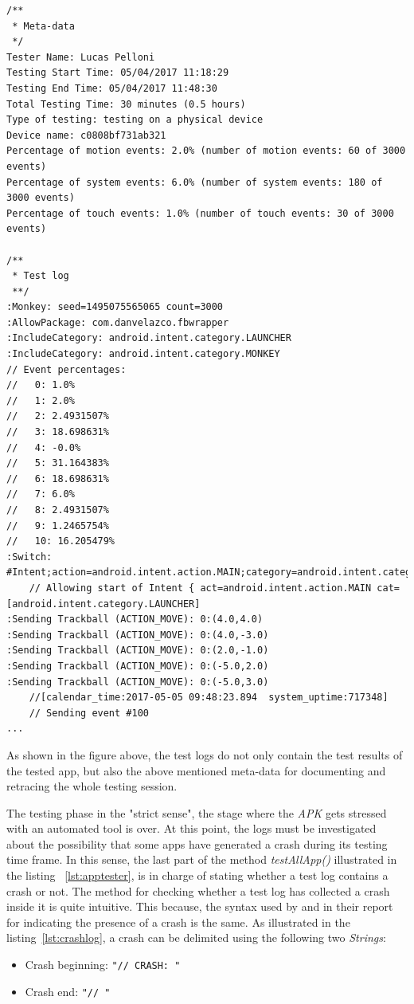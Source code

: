 \begin{lstlisting}[caption=Test log of com.danvelazco.fbwrapper, basicstyle=\fontsize{7}{8}\ttfamily,label={lst:testinglog}]
/**
 * Meta-data
 */
Tester Name: Lucas Pelloni
Testing Start Time: 05/04/2017 11:18:29
Testing End Time: 05/04/2017 11:48:30
Total Testing Time: 30 minutes (0.5 hours)
Type of testing: testing on a physical device
Device name: c0808bf731ab321
Percentage of motion events: 2.0% (number of motion events: 60 of 3000 events)
Percentage of system events: 6.0% (number of system events: 180 of 3000 events)
Percentage of touch events: 1.0% (number of touch events: 30 of 3000 events)

/**
 * Test log 
 **/
:Monkey: seed=1495075565065 count=3000
:AllowPackage: com.danvelazco.fbwrapper
:IncludeCategory: android.intent.category.LAUNCHER
:IncludeCategory: android.intent.category.MONKEY
// Event percentages:
//   0: 1.0%
//   1: 2.0%
//   2: 2.4931507%
//   3: 18.698631%
//   4: -0.0%
//   5: 31.164383%
//   6: 18.698631%
//   7: 6.0%
//   8: 2.4931507%
//   9: 1.2465754%
//   10: 16.205479%
:Switch: #Intent;action=android.intent.action.MAIN;category=android.intent.category.LAUNCHER;end
    // Allowing start of Intent { act=android.intent.action.MAIN cat=[android.intent.category.LAUNCHER]
:Sending Trackball (ACTION_MOVE): 0:(4.0,4.0)
:Sending Trackball (ACTION_MOVE): 0:(4.0,-3.0)
:Sending Trackball (ACTION_MOVE): 0:(2.0,-1.0)
:Sending Trackball (ACTION_MOVE): 0:(-5.0,2.0)
:Sending Trackball (ACTION_MOVE): 0:(-5.0,3.0)
    //[calendar_time:2017-05-05 09:48:23.894  system_uptime:717348]
    // Sending event #100
...
\end{lstlisting}

As shown in the figure above, the test logs do not only contain the test results of the tested app, but also the above mentioned meta-data for documenting and retracing the whole testing session.

The testing phase in the "strict sense", \ie the stage where the \textit{APK} gets stressed with an automated tool is over. At this point, the logs must be investigated about the possibility that some apps have generated a crash during its testing time frame. In this sense, the last part of the method \textit{testAllApp()} illustrated in the listing ~\ref{lst:apptester}, is in charge of stating whether a test log contains a crash or not. The method for checking whether a test log has collected a crash inside it is quite intuitive. This because, the syntax used by \monkey and \sapienz in their report for indicating the presence of a crash is the same. As illustrated in the listing~\ref{lst:crashlog}, a crash can be delimited using the following two \textit{Strings}: 
\begin{itemize}
\item Crash beginning: \texttt{"// CRASH: "}
\item Crash end: \texttt{"// "}
\end{itemize}

